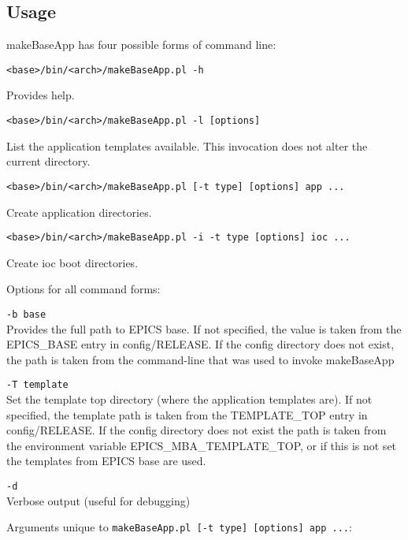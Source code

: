 \subsection{Usage}

makeBaseApp has four possible forms of command line:

\begin{verbatim}
<base>/bin/<arch>/makeBaseApp.pl -h
\end{verbatim}
Provides help.

\begin{verbatim}
<base>/bin/<arch>/makeBaseApp.pl -l [options]
\end{verbatim}
List the application templates available. This invocation does not alter the current directory.

\begin{verbatim}
<base>/bin/<arch>/makeBaseApp.pl [-t type] [options] app ... 
\end{verbatim}
Create application directories.

\begin{verbatim}
<base>/bin/<arch>/makeBaseApp.pl -i -t type [options] ioc ... 
\end{verbatim}
Create ioc boot directories.

Options for all command forms:

\begin{description}
\item \verb|-b base| \\
Provides the full path to EPICS base.
If not specified, the value is taken from the EPICS\_BASE entry in config/RELEASE.
If the config directory does not exist, the path is taken from the command-line that was used to invoke makeBaseApp

\item \verb|-T template| \\
Set the template top directory (where the application templates are).
If not specified, the template path is taken from the TEMPLATE\_TOP entry in config/RELEASE.
If the config directory does not exist the path is taken from the environment variable EPICS\_MBA\_TEMPLATE\_TOP, or if this is not set the templates from EPICS base are used.

\item \verb|-d| \\
Verbose output (useful for debugging)
\end{description}

Arguments unique to \verb|makeBaseApp.pl [-t type] [options] app ...|:


